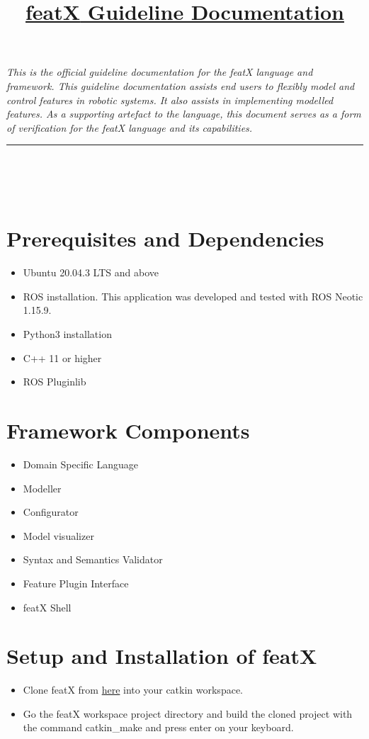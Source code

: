 \documentclass{article}
\title{\underline{\textbf{featX} Guideline Documentation}}
\author{}
\date{}
\begin{document}
\selectfont
\maketitle
\textit{This is the official guideline documentation for the featX language and framework. This guideline documentation assists end users to flexibly model and control features in robotic systems. It also assists in implementing modelled features. As a supporting artefact to the language,  this document serves as a form of verification for the featX language and its capabilities.}\\
\noindent\rule{17cm}{0.6pt}
\\\\\\
\tableofcontents

\newpage
\label{guide:docs}
\section{Prerequisites and Dependencies}
    \begin{itemize}
        \item Ubuntu 20.04.3 LTS and above
        \item ROS installation. This application was developed and tested with ROS Neotic 1.15.9.
        \item Python3 installation
        \item C++ 11 or higher
        \item ROS Pluginlib
    \end{itemize}

\section{Framework Components}
\begin{itemize}
	\item Domain Specific Language
	\item Modeller
	\item Configurator
	\item Model visualizer
	\item Syntax and Semantics Validator
	\item Feature Plugin Interface
	\item featX Shell
\end{itemize}

\section{Setup and Installation of featX}
\begin{itemize}
    \item Clone featX from \href{https://github.com/SergioGarG/sera-extension}{here} into your catkin workspace.
    \item Go the featX workspace project directory and build the cloned project with the command catkin\_make and press enter on your keyboard.
\end{itemize}
\end{document}
